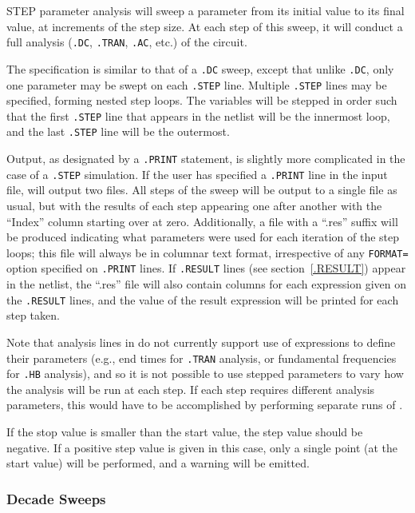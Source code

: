 \begin{Command}
STEP parameter analysis will sweep a parameter from its initial value to
its final value, at increments of the step size.  At each step of this
sweep, it will conduct a full analysis (\texttt{.DC}, \texttt{.TRAN},
\texttt{.AC}, etc.) of the circuit.

The specification is similar to that of a \texttt{.DC} sweep, except
that unlike \texttt{.DC}, only one parameter may be swept on
each \texttt{.STEP} line.  Multiple \texttt{.STEP} lines may be
specified, forming nested step loops.  The variables will be stepped
in order such that the first \texttt{.STEP} line that appears in the
netlist will be the innermost loop, and the last \texttt{.STEP} line
will be the outermost.

Output, as designated by a \texttt{.PRINT} statement, is slightly more
complicated in the case of a \texttt{.STEP} simulation.  If the user
has specified a \texttt{.PRINT} line in the input file, \Xyce{} will
output two files.  All steps of the sweep will be output to a single file as
usual, but with the results of each step appearing one after another
with the ``Index'' column starting over at zero.  Additionally, a file
with a ``.res'' suffix will be produced indicating what parameters
were used for each iteration of the step loops; this file will always
be in columnar text format, irrespective of any \texttt{FORMAT=}
option specified on \texttt{.PRINT} lines.  If \texttt{.RESULT} lines
(see section~\ref{.RESULT}) appear in the netlist, the ``.res'' file
will also contain columns for each expression given
on the \texttt{.RESULT} lines, and the value of the result expression
will be printed for each step taken.

Note that analysis lines in \Xyce{} do not currently support use of
expressions to define their parameters (e.g., end times
for \texttt{.TRAN} analysis, or fundamental frequencies
for \texttt{.HB} analysis), and so it is not possible to use stepped
parameters to vary how the analysis will be run at each step.  If each
step requires different analysis parameters, this would have to be
accomplished by performing separate runs of \Xyce{}.

If the stop value is smaller than the start value, the step value
should be negative.  If a positive step value is given in this case,
only a single point (at the start value) will be performed, and a
warning will be emitted.

\end{Command}

\subsubsection{Decade Sweeps}
 

